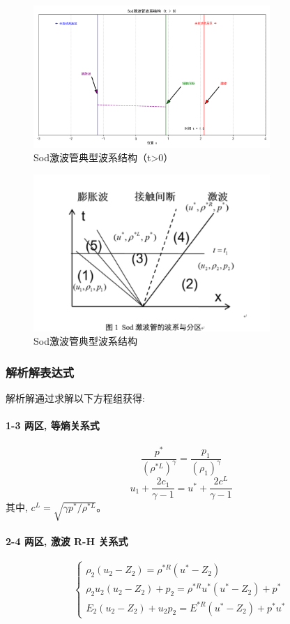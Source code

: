 \documentclass[UTF8]{ctexart}
\begin{document}
\begin{figure}[H]
    \centering
    \includegraphics[width=0.8\textwidth]{wave_structure_1.png}
    \caption{Sod激波管典型波系结构（t>0）}
    \label{fig:wave_structure_1}
\end{figure}
\begin{figure}[H]
    \centering
    \includegraphics[width=0.8\textwidth]{wave_structure_2.png}
    \caption{Sod激波管典型波系结构}
    \label{fig:wave_structure_2}
\end{figure}
\subsubsection{解析解表达式}
解析解通过求解以下方程组获得:
\paragraph{1-3 两区, 等熵关系式}
$$\frac{p^{*}}{\left(\rho^{* L}\right)^{\gamma}}=\frac{p_{1}}{\left(\rho_{1}\right)^{\gamma}}$$
$$
u_{1}+\frac{2 c_{1}}{\gamma-1}=u^{*}+\frac{2 c^{L}}{\gamma-1}$$
其中, $c^{L}=\sqrt{\gamma p^{*} / \rho^{* L}}$。
\paragraph{2-4 两区, 激波 R-H 关系式}
$$\left\{\begin{array}{l}\rho_{2}\left(u_{2}-Z_{2}\right)=\rho^{* R}\left(u^{*}-Z_{2}\right) \\\rho_{2} u_{2}\left(u_{2}-Z_{2}\right)+p_{2}=\rho^{* R} u^{*}\left(u^{*}-Z_{2}\right)+p^{*} \\E_{2}\left(u_{2}-Z_{2}\right)+u_{2} p_{2}=E^{* R}\left(u^{*}-Z_{2}\right)+p^{*} u^{*}\end{array}\right.$$
\end{document}
